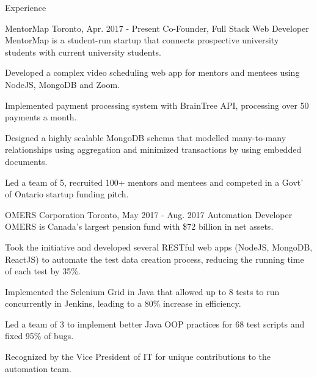 \documentclass{resume} %
\begin{document}
\begin{rSection}{Experience}

\begin{expSec}
{MentorMap}
{Toronto, Apr. 2017 - Present}
{Co-Founder, Full Stack Web Developer \href{https://www.mentormap.ca/}{\space\small\faExternalLink}}
{MentorMap is a student-run startup that connects prospective university students with current university students.}
\item Developed a complex video scheduling web app for mentors and mentees using NodeJS, MongoDB and Zoom.
\item Implemented payment processing system with BrainTree API, processing over 50 payments a month.
\item Designed a highly scalable MongoDB schema that modelled many-to-many relationships using aggregation and minimized transactions by using embedded documents.
\item Led a team of 5, recruited 100+ mentors and mentees and competed in a Govt' of Ontario startup funding pitch.
\end{expSec}

\begin{expSec}
{OMERS Corporation}
{Toronto, May 2017 - Aug. 2017}
{Automation Developer \href{http://www.omers.com/}{\space\small\faExternalLink}}
{OMERS is Canada's largest pension fund with \$72 billion in net assets.}
\item Took the initiative and developed several RESTful web apps \href{https://github.com/jsun98/OMERS_DataCreation}{\small\faGithub}
(NodeJS, MongoDB, ReactJS) to automate the test data creation process, reducing the running time of each test by 35\%.
\item Implemented the Selenium Grid in Java that allowed up to 8 tests to run concurrently in Jenkins, leading to a 80\% increase in efficiency.
\item Led a team of 3 to implement better Java OOP practices for 68 test scripts and fixed 95\% of bugs.
\item Recognized by the Vice President of IT for unique contributions to the automation team.
\end{expSec}



\end{rSection}


\end{document}
